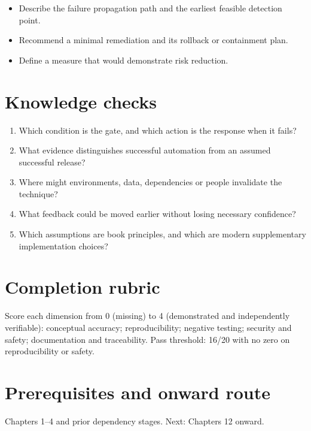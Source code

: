 \documentclass[10pt,letterpaper]{article}
\begin{document}
\begin{itemize}
\item Describe the failure propagation path and the earliest feasible detection point.
\item Recommend a minimal remediation and its rollback or containment plan.
\item Define a measure that would demonstrate risk reduction.
\end{itemize}

\section{Knowledge checks}
\begin{enumerate}
\item Which condition is the gate, and which action is the response when it fails?
\item What evidence distinguishes successful automation from an assumed successful release?
\item Where might environments, data, dependencies or people invalidate the technique?
\item What feedback could be moved earlier without losing necessary confidence?
\item Which assumptions are book principles, and which are modern supplementary implementation choices?
\end{enumerate}

\section{Completion rubric}
Score each dimension from 0 (missing) to 4 (demonstrated and independently verifiable): conceptual accuracy; reproducibility; negative testing; security and safety; documentation and traceability. Pass threshold: 16/20 with no zero on reproducibility or safety.


\section{Prerequisites and onward route}
Chapters 1--4 and prior dependency stages. Next: Chapters 12 onward.
\end{document}
